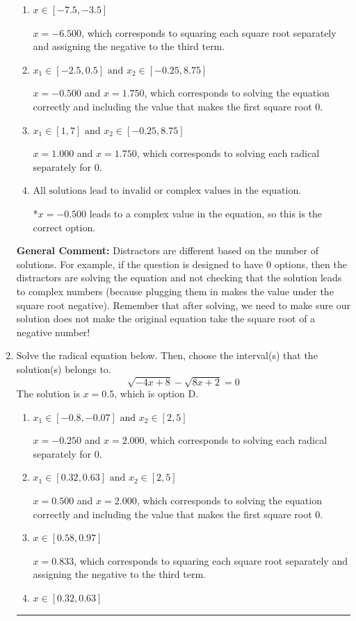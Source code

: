 \documentclass{extbook}[14pt]
\newcommand{\litem}[1]{\item #1

\rule{\textwidth}{0.4pt}}
\begin{document}
\begin{enumerate}
{\begin{enumerate}[label=\Alph*.]
This corresponds to not checking that the potential solution $x = -0.500$ leads to a complex value in the original equation.
\item \( x \in [-7.5,-3.5] \)

$x = -6.500$, which corresponds to squaring each square root separately and assigning the negative to the third term.
\item \( x_1 \in [-2.5, 0.5] \text{ and } x_2 \in [-0.25,8.75] \)

$x = -0.500$ and $x = 1.750$, which corresponds to solving the equation correctly and including the value that makes the first square root 0.
\item \( x_1 \in [1, 7] \text{ and } x_2 \in [-0.25,8.75] \)

$x = 1.000$ and $x = 1.750$, which corresponds to solving each radical separately for 0.
\item \( \text{All solutions lead to invalid or complex values in the equation.} \)

*$x = -0.500$ leads to a complex value in the equation, so this is the correct option.
\end{enumerate}

\textbf{General Comment:} Distractors are different based on the number of solutions. For example, if the question is designed to have 0 options, then the distractors are solving the equation and not checking that the solution leads to complex numbers (because plugging them in makes the value under the square root negative). Remember that after solving, we need to make sure our solution does not make the original equation take the square root of a negative number!
}
\litem{
Solve the radical equation below. Then, choose the interval(s) that the solution(s) belongs to.
\[ \sqrt{-4 x + 8} - \sqrt{8 x + 2} = 0 \]The solution is \( x = 0.5 \), which is option D.\begin{enumerate}[label=\Alph*.]
\item \( x_1 \in [-0.8, -0.07] \text{ and } x_2 \in [2,5] \)

$x = -0.250$ and $x = 2.000$, which corresponds to solving each radical separately for 0.
\item \( x_1 \in [0.32, 0.63] \text{ and } x_2 \in [2,5] \)

$x = 0.500$ and $x = 2.000$, which corresponds to solving the equation correctly and including the value that makes the first square root 0.
\item \( x \in [0.58,0.97] \)

$x = 0.833$, which corresponds to squaring each square root separately and assigning the negative to the third term.
\item \( x \in [0.32,0.63] \)


\end{enumerate}}
\end{enumerate}
\end{document}
